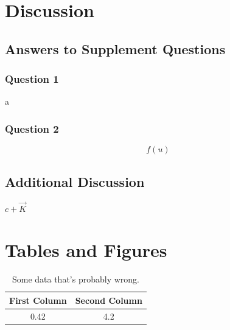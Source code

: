 \documentclass[12pt]{article} %
\begin{document}
\section*{Discussion}
\subsection*{Answers to Supplement Questions}
\subsubsection*{Question 1}
a
\subsubsection*{Question 2}
\begin{equation}
    f(u)
\end{equation}
\subsection*{Additional Discussion}
$c + \vec{K}$
\section*{Tables and Figures}
\begin{table}[H]
    \centering
    \caption{Some data that's probably wrong.}
    \label{tab:foo}
    \begin{tabular}{ c  c }
        \hline
        \textbf{First Column} & \textbf{Second Column}\\
        \hline
        0.42 & 4.2 \\
        \hline
    \end{tabular}
\end{table}
\end{document}
